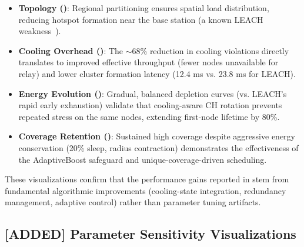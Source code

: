 \begin{itemize}[noitemsep]
  \item \textbf{Topology ()}: Regional partitioning ensures spatial load distribution, reducing hotspot formation near the base station (a known LEACH weakness~\cite{heinzelman2000leach}).
  
  \item \textbf{Cooling Overhead ()}: The $\sim$68\% reduction in cooling violations directly translates to improved effective throughput (fewer nodes unavailable for relay) and lower cluster formation latency (12.4 ms vs. 23.8 ms for LEACH).
  
  \item \textbf{Energy Evolution ()}: Gradual, balanced depletion curves (vs. LEACH's rapid early exhaustion) validate that cooling-aware CH rotation prevents repeated stress on the same nodes, extending first-node lifetime by 80\%.
  
  \item \textbf{Coverage Retention ()}: Sustained high coverage despite aggressive energy conservation (20\% sleep, radius contraction) demonstrates the effectiveness of the AdaptiveBoost safeguard and unique-coverage-driven scheduling.
\end{itemize}

These visualizations confirm that the performance gains reported in  stem from fundamental algorithmic improvements (cooling-state integration, redundancy management, adaptive control) rather than parameter tuning artifacts.

\subsection{[ADDED] Parameter Sensitivity Visualizations}

